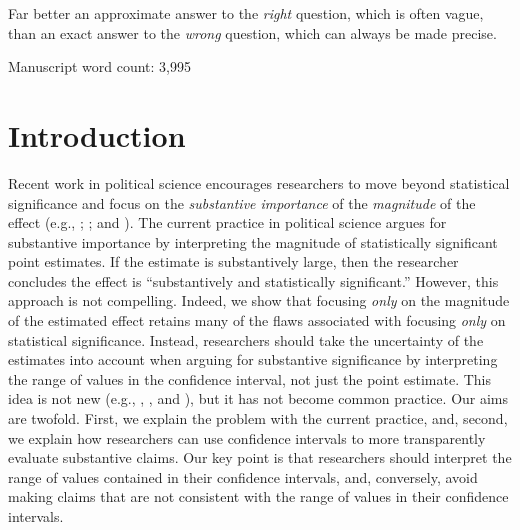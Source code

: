 \documentclass[12pt]{article}
\begin{document}
\epigraph{Far better an approximate answer to the \textit{right} question, which is often vague, than an exact answer to the \textit{wrong} question, which can always be made precise.}{\citet[pp. 13-14]{Tukey1962}}

\begin{center}
Manuscript word count: 3,995
\end{center}

\thispagestyle{empty}

\newpage
\doublespace

\section*{Introduction}

Recent work in political science encourages researchers to move beyond statistical significance and focus on the \emph{substantive importance} of the \emph{magnitude} of the effect (e.g., \citealt{KingTomzWittenberg2000}; \citealt{HanmerKalkan2013}; and \citealt{EsareyDanneman2014}). The current practice in political science argues for substantive importance by interpreting the magnitude of statistically significant point estimates. If the estimate is substantively large, then the researcher concludes the effect is ``substantively and statistically significant.'' However, this approach is not compelling. Indeed, we show that focusing \emph{only} on the magnitude of the estimated effect retains many of the flaws associated with focusing \emph{only} on statistical significance. Instead, researchers should take the uncertainty of the estimates into account when arguing for substantive significance by interpreting the range of values in the confidence interval, not just the point estimate. This idea is not new (e.g., \citealt{Achen1982}, \citealt{Gross2014}, and \citealt{Rainey2014}), but it has not become common practice. Our aims are twofold. First, we explain the problem with the current practice, and, second, we explain how researchers can use confidence intervals to more transparently evaluate substantive claims. Our key point is that researchers should interpret the range of values contained in their confidence intervals, and, conversely, avoid making claims that are not consistent with the range of values in their confidence intervals.
\end{document}
